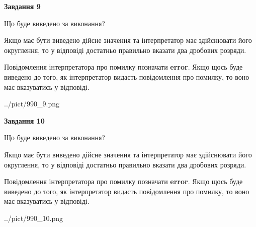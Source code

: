 \documentclass[12pt, ukrainian]{article}
\begin{document}
{\begin {Large}
{\begin {center}\textbf{Завдання 9}\end {center}}\par
Що буде виведено за виконання? \par

Якщо має бути виведено дійсне значення та інтерпретатор має здійснювати його округлення, 
то у відповіді достатньо правильно вказати два дробових розряди.

Повідомлення інтерпретатора про помилку позначати \textbf{error}.
Якщо щось буде виведено до того, як інтерпретатор видасть повідомлення про помилку, 
то воно має вказуватись у відповіді. \par

\begin{center}
	{../pict/990_9.png}
\end{center}
\newpage

{\begin {center}\textbf{Завдання 10}\end {center}}\par
Що буде виведено за виконання? \par

Якщо має бути виведено дійсне значення та інтерпретатор має здійснювати його округлення, 
то у відповіді достатньо правильно вказати два дробових розряди.

Повідомлення інтерпретатора про помилку позначати \textbf{error}.
Якщо щось буде виведено до того, як інтерпретатор видасть повідомлення про помилку, 
то воно має вказуватись у відповіді. \par

\begin{center}
	{../pict/990_10.png}
\end{center}
\newpage

\end {Large}}
\end{document}
